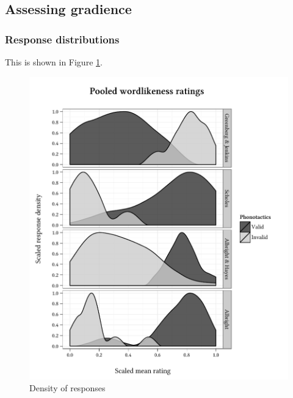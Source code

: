 \subsection{Assessing gradience}

\subsubsection{Response distributions}

This is shown in Figure \ref{density}.

\begin{figure}
\centering
\includegraphics{density.pdf}
\caption{Density of responses}
\label{density}
\end{figure}

